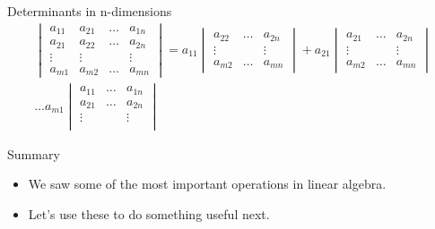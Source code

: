 \documentclass[notes=only]{beamer}
\begin{document}
    \begin{frame}{Determinants in n-dimensions}
      \begin{align*}
      \begin{vmatrix}
        a_{11} & a_{21} & \dots & a_{1n} \\
        a_{21} & a_{22} & \dots & a_{2n} \\
        \vdots & \vdots &       & \vdots \\
        a_{m1} & a_{m2} & \dots & a_{mn}
      \end{vmatrix}
    = a_{11} \begin{vmatrix}
      a_{22} & \dots & a_{2n} \\
      \vdots &        & \vdots \\
      a_{m2} & \dots & a_{mn}
    \end{vmatrix}
    + a_{21} 
    \begin{vmatrix}
      a_{21} & \dots & a_{2n} \\
      \vdots &        & \vdots \\
      a_{m2} & \dots & a_{mn}
    \end{vmatrix}
    \\
    \dots 
     a_{m1}
    \begin{vmatrix} 
      a_{11} & \dots & a_{1n} \\
      a_{21} & \dots & a_{2n} \\
      \vdots &        & \vdots \\
    \end{vmatrix}
    \end{align*}
    \end{frame}

    \begin{frame}{Summary}
      \begin{itemize}
        \item We saw some of the most important operations in linear algebra.
        \item Let's use these to do something useful next.
      \end{itemize}
    \end{frame}
\end{document}
